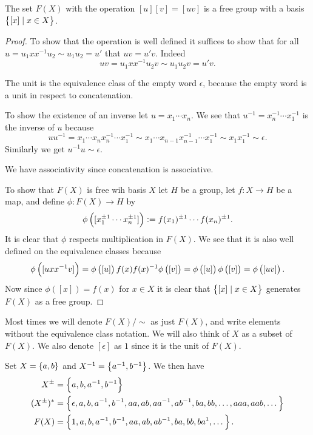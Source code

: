 \documentclass[11pt,a4paper]{article}
\begin{document}
\begin{proposition}
  The set $F(X)$ with the operation $[u][v] = [uv]$ is a free group with
  a basis $\left\{[x] \mid x \in X\right\}$.
\end{proposition}
\begin{proof}
  To show that the operation is well defined it suffices to show that
  for all $u = u_1 x x^{-1} u_2 \sim u_1 u_2 = u'$ that
  $uv = u'v$.
  Indeed
  \[
    uv = u_1 x x^{-1} u_2 v \sim u_1 u_2 v = u'v.
  \]

  The unit is the equivalence class of the empty word $\epsilon$,
  because the empty word is a unit in respect to concatenation.

  To show the existence of an inverse let $u = x_1 \cdots x_n$.
  We see that $u^{-1} = x_n^{-1} \cdots x_1^{-1}$ is the inverse of $u$
  because
  \[
    u u^{-1} =
    x_1 \cdots x_n x_n^{-1} \cdots x_1^{-1} \sim
    x_1 \cdots x_{n-1} x_{n-1}^{-1} \cdots x_1^{-1} \sim
    x_1 x_1^{-1} \sim
    \epsilon.
  \]
  Similarly we get $u^{-1} u \sim \epsilon$.

  We have associativity since concatenation is associative.

  To show that $F(X)$ is free wih basis $X$ let $H$ be a group,
  let $f \colon X \to H$ be a map, and define $\phi \colon F(X) \to H$
  by
  \[
    \phi\del{[x_1^{\pm1} \cdots x_n^{\pm1}]} :=
    f(x_1)^{\pm1} \cdots f(x_n)^{\pm1}.
  \]
  It is clear that $\phi$ respects multiplication in $F(X)$.
  We see that it is also well defined on the equivalence classes because
  \[
    \phi\del{[uxx^{-1}v]} =
    \phi\del{[u]} f(x) f(x)^{-1} \phi\del{[v]} =
    \phi\del{[u]} \phi\del{[v]} =
    \phi\del{[uv]}.
  \]
  Now since $\phi([x]) = f(x)$ for $x \in X$ it is clear that
  $\left\{[x] \mid x \in X\right\}$ generates $F(X)$ as a free group.
\end{proof}
\begin{remark}
  Most times we will denote $F(X) / \sim$ as just $F(X)$, and
  write elements without the equivalence class notation.
  We will also think of $X$ as a subset of $F(X)$.
  We also denote $[\epsilon]$ as $1$ since it is the unit of $F(X)$.
\end{remark}

\begin{example}
  Set $X = \left\{a,b\right\}$ and $X^{-1} = \left\{a^{-1}, b^{-1}\right\}$.
  We then have
  \begin{align*}
    X^{\pm} &= \left\{a,b,a^{-1},b^{-1}\right\} \\
    (X^{\pm})^* &= \left\{\epsilon, a, b, a^{-1}, b^{-1}, aa, ab, aa^{-1},
    ab^{-1}, ba, bb, \dots, aaa, aab, \dots\right\} \\
      F(X) &= \left\{1, a, b, a^{-1}, b^{-1}, aa, ab ,ab^{-1}, ba, bb, ba^{1},
      \dots\right\}.
  \end{align*}
\end{example}
\end{document}
